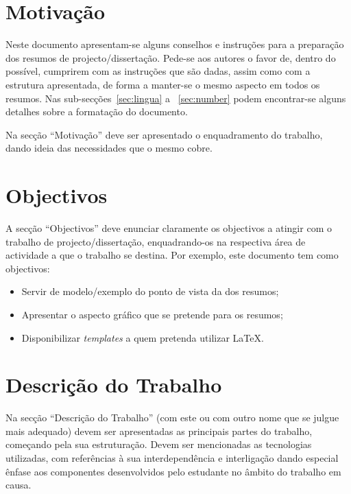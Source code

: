 \documentclass[9pt,a4paper]{extarticle}
\begin{document}
\begin{multicols}{2}

\section{Motivação}\label{sec:motiva}

Neste documento apresentam-se alguns conselhos e instruções para a preparação dos resumos de projecto/dissertação.
Pede-se aos autores o favor de, dentro do possível, cumprirem com as instruções que são dadas, assim como com a estrutura apresentada, de forma a manter-se o mesmo aspecto em todos os resumos.
Nas sub-secções~\ref{sec:lingua} a ~\ref{sec:number} podem encontrar-se alguns detalhes sobre a formatação do documento.

Na secção ``Motivação'' deve ser apresentado o enquadramento do trabalho, dando ideia das necessidades que o mesmo cobre.

\section{Objectivos}\label{sec:goals}

A secção ``Objectivos'' deve enunciar claramente os objectivos a atingir com o trabalho de projecto/dissertação, enquadrando-os na respectiva área de actividade a que o trabalho se destina.
Por exemplo, este documento tem como objectivos:
\begin{itemize}
\item Servir de modelo/exemplo do ponto de vista da dos resumos;
\item Apresentar o aspecto gráfico que se pretende para os resumos;
\item Disponibilizar \emph{templates} a quem pretenda utilizar \LaTeX.
\end{itemize}

\section{Descrição do Trabalho}\label{sec:work}

Na secção ``Descrição do Trabalho'' (com este ou com outro nome que se julgue mais adequado) devem ser apresentadas as principais partes do trabalho, começando pela sua estruturação. Devem ser mencionadas as tecnologias utilizadas, com referências à sua interdependência e interligação dando especial ênfase aos componentes desenvolvidos pelo estudante no âmbito do trabalho em causa.


\end{multicols}
\end{document}
